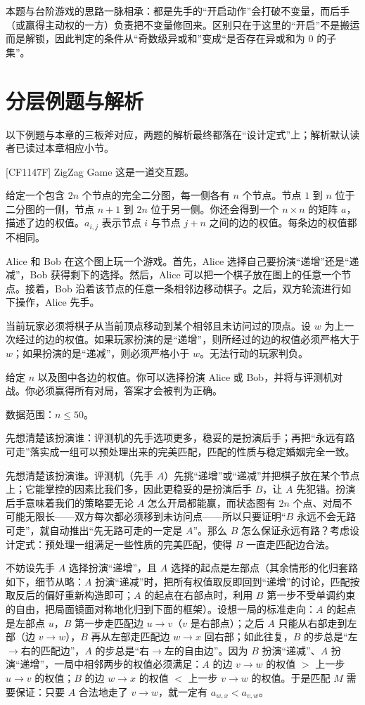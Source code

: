 本题与台阶游戏的思路一脉相承：都是先手的“开启动作”会打破不变量，而后手（或赢得主动权的一方）负责把不变量修回来。区别只在于这里的“开启”不是搬运而是解锁，因此判定的条件从“奇数级异或和”变成“是否存在异或和为 $0$ 的子集”。

\section{分层例题与解析}

以下例题与本章的三板斧对应，两题的解析最终都落在“设计定式”上；解析默认读者已读过本章相应小节。

\begin{problem}{[CF1147F] ZigZag Game}
这是一道交互题。

给定一个包含 $2n$ 个节点的完全二分图，每一侧各有 $n$ 个节点。节点 $1$ 到 $n$ 位于二分图的一侧，节点 $n+1$ 到 $2n$ 位于另一侧。你还会得到一个 $n\times n$ 的矩阵 $a$，描述了边的权值。$a_{i,j}$ 表示节点 $i$ 与节点 $j+n$ 之间的边的权值。每条边的权值都不相同。

Alice 和 Bob 在这个图上玩一个游戏。首先，Alice 选择自己要扮演“递增”还是“递减”，Bob 获得剩下的选择。然后，Alice 可以把一个棋子放在图上的任意一个节点。接着，Bob 沿着该节点的任意一条相邻边移动棋子。之后，双方轮流进行如下操作，Alice 先手。

当前玩家必须将棋子从当前顶点移动到某个相邻且未访问过的顶点。设 $w$ 为上一次经过的边的权值。如果玩家扮演的是“递增”，则所经过的边的权值必须严格大于 $w$；如果扮演的是“递减”，则必须严格小于 $w$。无法行动的玩家判负。

给定 $n$ 以及图中各边的权值。你可以选择扮演 Alice 或 Bob，并将与评测机对战。你必须赢得所有对局，答案才会被判为正确。

数据范围：$n\le50$。
\end{problem}

\hint 先想清楚该扮演谁：评测机的先手选项更多，稳妥的是扮演后手；再把“永远有路可走”落实成一组可以预处理出来的完美匹配，匹配的性质与稳定婚姻完全一致。

\sol 先想清楚该扮演谁。评测机（先手 $A$）先挑“递增”或“递减”并把棋子放在某个节点上；它能掌控的因素比我们多，因此更稳妥的是扮演后手 $B$，让 $A$ 先犯错。扮演后手意味着我们的策略要无论 $A$ 怎么开局都能赢，而状态图有 $2n$ 个点、对局不可能无限长——双方每次都必须移到未访问点——所以只要证明“$B$ 永远不会无路可走”，就自动推出“先无路可走的一定是 $A$”。那么 $B$ 怎么保证永远有路？考虑设计定式：预处理一组满足一些性质的完美匹配，使得 $B$ 一直走匹配边合法。

不妨设先手 $A$ 选择扮演“递增”，且 $A$ 选择的起点是左部点（其余情形的化归套路如下，细节从略：$A$ 扮演“递减”时，把所有权值取反即回到“递增”的讨论，匹配按取反后的偏好重新构造即可；$A$ 的起点在右部点时，利用 $B$ 第一步不受单调约束的自由，把局面镜面对称地化归到下面的框架）。设想一局的标准走向：$A$ 的起点是左部点 $u$，$B$ 第一步走匹配边 $u\to v$（$v$ 是右部点）；之后 $A$ 只能从右部走到左部（边 $v\to w$），$B$ 再从左部走匹配边 $w\to x$ 回右部；如此往复，$B$ 的步总是“左$\to$右的匹配边”，$A$ 的步总是“右$\to$左的自由边”。因为 $B$ 扮演“递减”、$A$ 扮演“递增”，一局中相邻两步的权值必须满足：$A$ 的边 $v\to w$ 的权值 $>$ 上一步 $u\to v$ 的权值；$B$ 的边 $w\to x$ 的权值 $<$ 上一步 $v\to w$ 的权值。于是匹配 $M$ 需要保证：只要 $A$ 合法地走了 $v\to w$，就一定有 $a_{w,x}<a_{v,w}$。

